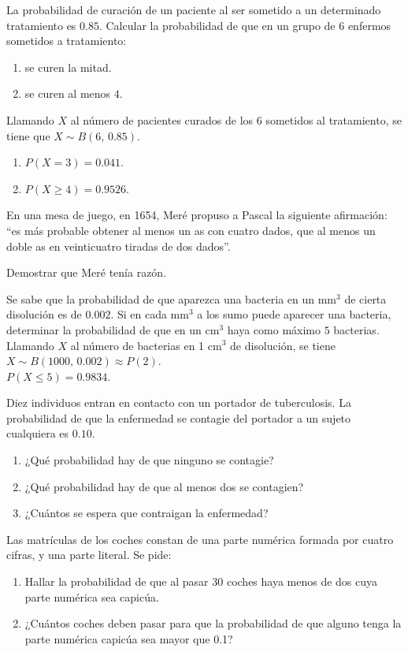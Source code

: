 {La probabilidad de curación de un paciente al ser sometido a un determinado tratamiento es $0.85$.
Calcular la probabilidad de que en un grupo de $6$ enfermos sometidos a tratamiento:
\begin{enumerate}
\item se curen la mitad.
\item se curen al menos $4$.
\end{enumerate}
}
{Llamando $X$ al número de pacientes curados de los 6 sometidos al tratamiento, se tiene que $X\sim B(6,\,0.85)$.
\begin{enumerate}
\item $P(X=3)=0.041$.
\item $P(X\geq 4)=0.9526$.
\end{enumerate}
}
{}


{En una mesa de juego, en 1654, Meré propuso a Pascal la siguiente afirmación: ``es más probable obtener al menos un as con cuatro dados, que al menos un doble as en veinticuatro tiradas de dos dados''.

Demostrar que Meré tenía razón.
}
{}
{}


{Se sabe que la probabilidad de que aparezca una bacteria en un mm$^3$ de cierta disolución es de $0.002$.
Si en cada mm$^3$ a los sumo puede aparecer una bacteria, determinar la probabilidad de que en un cm$^3$ haya como
máximo $5$ bacterias.}
{Llamando $X$ al número de bacterias en 1 cm$^3$ de disolución, se tiene $X\sim B(1000,\,0.002)\approx P(2)$.\\
$P(X\leq 5)=0.9834$.
}
{}


{Diez individuos entran en contacto con un portador de tuberculosis. La probabilidad de que la enfermedad se contagie del portador a un sujeto cualquiera es $0.10$.
\begin{enumerate}
\item ¿Qué probabilidad hay de que ninguno se contagie?
\item ¿Qué probabilidad hay de que al menos dos se contagien?
\item ¿Cuántos se espera que contraigan la enfermedad?
\end{enumerate}
}
{}
{}


{Las matrículas de los coches constan de una parte numérica formada por cuatro cifras, y una parte literal. Se pide:

\begin{enumerate}
\item  Hallar la probabilidad de que al pasar 30 coches haya menos de dos cuya parte numérica sea capicúa.
\item  ¿Cuántos coches deben pasar para que la probabilidad de que alguno tenga la parte numérica capicúa sea mayor
que 0.1?
\end{enumerate}
}
{}
{}


